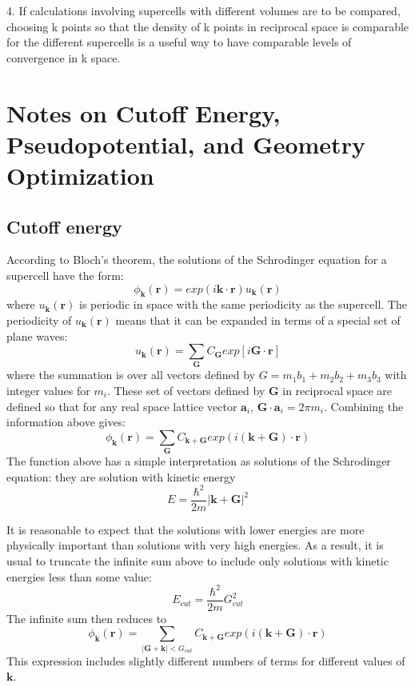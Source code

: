 \documentclass[12pt]{article}
\begin{document}
4. If calculations involving supercells with different volumes are to be compared, choosing k points so that the density of k points in reciprocal space is comparable for the different supercells is a useful way to have comparable levels of convergence in k space.

\section{Notes on Cutoff Energy, Pseudopotential, and Geometry Optimization}
\subsection{Cutoff energy}
According to Bloch's theorem, the solutions of the Schrodinger equation for a supercell have the form:
\begin{equation}
    \phi_{\boldsymbol{k}}(\boldsymbol{r})=exp(i\boldsymbol{k\cdot r})u_{\boldsymbol{k}}(\boldsymbol{r})
\end{equation}
where $u_{\boldsymbol{k}}(\boldsymbol{r})$ is periodic in space with the same periodicity as the supercell. The periodicity of  $u_{\boldsymbol{k}}(\boldsymbol{r})$ means that it can be expanded in terms of a special set of plane waves:
\begin{equation}
    u_{\boldsymbol{k}}(\boldsymbol{r})=\sum_{\boldsymbol{G}}C_{\boldsymbol{G}}exp[i\boldsymbol{G}\cdot \boldsymbol{r}]
\end{equation}
where the summation is over all vectors defined by $G=m_1b_1+m_2b_2+m_3b_3$ with integer values for $m_i$. These set of vectors defined by $\boldsymbol{G}$ in reciprocal space are defined so that for any real space lattice vector $\boldsymbol{a}_i$, $\boldsymbol{G}\cdot \boldsymbol{a}_i=2\pi m_i$. Combining the information above gives:
\begin{equation}
    \phi_{\boldsymbol{k}}(\boldsymbol{r})=\sum_{\boldsymbol{G}}C_{\boldsymbol{k+G}}exp(i\boldsymbol{(k+G)\cdot r})
\end{equation}
The function above has a simple interpretation as solutions of the Schrodinger equation: they are solution with kinetic energy
\begin{equation}
    E = \frac{\hbar^2}{2m}|\boldsymbol{k}+\boldsymbol{G}|^2
\end{equation}

It is reasonable to expect that the solutions with lower energies are more physically important than solutions with very high energies. As a result, it is usual to truncate the infinite sum above to include only solutions with kinetic energies less than some value:
\begin{equation}
    E_{cut}=\frac{\hbar^2}{2m}G^2_{cut}
\end{equation}
The infinite sum then reduces to 
\begin{equation}
    \phi_{\boldsymbol{k}}(\boldsymbol{r})=\sum_{\boldsymbol{|G+k|}<G_{cut}}C_{\boldsymbol{k+G}}exp(i\boldsymbol{(k+G)\cdot r})
\end{equation}
This expression includes slightly different numbers of terms for different values of $\boldsymbol{k}$.
\end{document}
